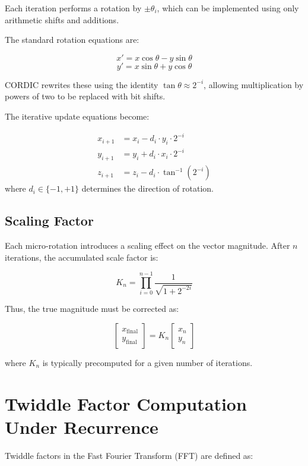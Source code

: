 Each iteration performs a rotation by $\pm \theta_i$, which can be implemented using only arithmetic shifts and additions.

The standard rotation equations are:

\begin{equation}
	x' = x \cos\theta - y \sin\theta
\end{equation}
\begin{equation}
	y' = x \sin\theta + y \cos\theta
\end{equation}

CORDIC rewrites these using the identity $\tan\theta \approx 2^{-i}$, allowing multiplication by powers of two to be replaced with bit shifts.

The iterative update equations become:

\begin{align}
	x_{i+1} &= x_i - d_i \cdot y_i \cdot 2^{-i} \\
	y_{i+1} &= y_i + d_i \cdot x_i \cdot 2^{-i} \\
	z_{i+1} &= z_i - d_i \cdot \tan^{-1}(2^{-i})
\end{align}
where $d_i \in \{-1, +1\}$ determines the direction of rotation.

\subsection{Scaling Factor}

Each micro-rotation introduces a scaling effect on the vector magnitude. After $n$ iterations, the accumulated scale factor is:

\begin{equation}
	K_n = \prod_{i=0}^{n-1} \frac{1}{\sqrt{1 + 2^{-2i}}}
\end{equation}

Thus, the true magnitude must be corrected as:

\begin{equation}
	\begin{bmatrix}
		x_{\text{final}} \\
		y_{\text{final}}
	\end{bmatrix}
	=
	K_n
	\begin{bmatrix}
		x_n \\
		y_n
	\end{bmatrix}
\end{equation}

where $K_n$ is typically precomputed for a given number of iterations.

\section{Twiddle Factor Computation Under Recurrence}
Twiddle factors in the Fast Fourier Transform (FFT) are defined as:

